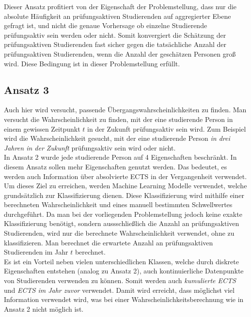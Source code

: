 Dieser Ansatz profitiert von der Eigenschaft der Problemstellung, dass nur die absolute H\"aufigkeit an pr\"ufungsaktiven Studierenden auf aggregierter Ebene
gefragt ist, und nicht die genaue Vorhersage ob einzelne Studierende pr\"ufungsaktiv sein werden oder nicht.
Somit konvergiert die Sch\"atzung der pr\"ufungsaktiven Studierenden
fast sicher gegen die tats\"achliche Anzahl der pr\"ufungsaktiven Studierenden, wenn die Anzahl der gesch\"atzen Personen gro{\ss} wird. Diese Bedingung ist in dieser Problemstellung
erf\"ullt. \\







\subsection{Ansatz 3}
\label{sec:appr3}

Auch hier wird versucht, passende \"Ubergangswahrscheinlichkeiten zu finden. Man versucht die Wahrscheinlichkeit zu finden, mit der eine studierende Person in einem
gewissen Zeitpunkt $t$ in der Zukunft pr\"ufungsaktiv sein wird.
Zum Beispiel wird die Wahrscheinlichkeit gesucht, mit der eine studierende Person \textit{in drei Jahren in der Zukunft} pr\"ufungsaktiv sein wird oder nicht. \\


In Ansatz 2 wurde jede studierende Person auf 4 Eigenschaften beschr\"ankt.
In diesem Ansatz sollen mehr Eigenschaften genutzt werden. Das bedeutet, es werden auch Information
\"uber absolvierte ECTS in der Vergangenheit verwendet. \\


Um dieses Ziel zu erreichen, werden Machine Learning Modelle verwendet, welche grunds\"atzlich zur Klassifizierung dienen.
Diese Klassifizierung wird mithilfe einer berechneten Wahrscheinlichkeit und eines manuell bestimmten Schwellwertes durchgef\"uhrt.
Da man bei der vorliegenden Problemstellung jedoch keine exakte Klassifizierung ben\"otigt, sondern aussschlie{\ss}lich die Anzahl an
pr\"ufungsaktiven Studierenden, wird nur die berechnete Wahrscheinlichkeit verwendet, ohne zu klassifizieren. Man berechnet die erwartete Anzahl an pr\"ufungsaktiven
Studierenden im Jahr $t$ berechnet. \\

Es ist ein Vorteil neben vielen unterschiedlichen Klassen, welche durch diskrete Eigenschaften entstehen (analog zu Ansatz 2), auch kontinuierliche Datenpunkte von
Studierenden verwenden zu k\"onnen. Somit werden auch \textit{\glqq kumulierte ECTS\grqq{}} und \textit{\glqq ECTS im Jahr zuvor\grqq{}} verwendet. Damit wird erreicht, dass
m\"oglichst viel Information verwendet wird, was bei einer Wahrscheinlichkeitsberechnung wie in Ansatz 2 nicht m\"oglich ist. \\

